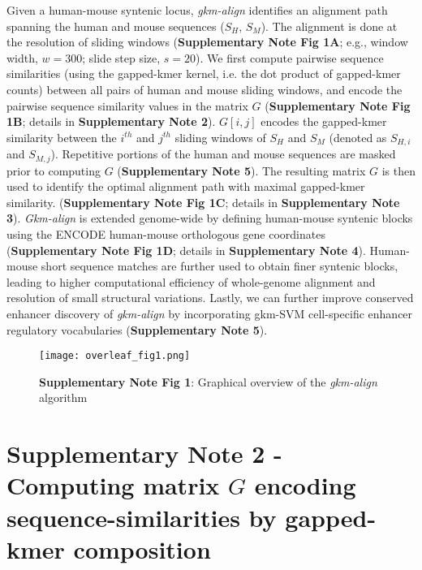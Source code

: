 \documentclass[english]{article}
\begin{document}
Given a human-mouse syntenic locus, \textit{gkm-align} identifies an alignment path spanning the human and mouse sequences ($S_H$, $S_M$). The alignment is done at the resolution of sliding windows (\textbf{Supplementary Note Fig 1A}; e.g., window width, $w = 300$; slide step size, $s = 20$). We first compute pairwise sequence similarities (using the gapped-kmer kernel, i.e. the dot product of gapped-kmer counts) between all pairs of human and mouse sliding windows, and encode the pairwise sequence similarity values in the matrix $G$ (\textbf{Supplementary Note Fig 1B}; details in \textbf{Supplementary Note 2}). $G[i,j]$ encodes the gapped-kmer similarity between the $i^{th}$ and $j^{th}$ sliding windows of $S_H$ and ${S_M}$ (denoted as $S_{H,i}$ and $S_{M,j}$). Repetitive portions of the human and mouse sequences are masked prior to computing $G$ (\textbf{Supplementary Note 5}). The resulting matrix $G$ is then used to identify the optimal alignment path with maximal gapped-kmer similarity. (\textbf{Supplementary Note Fig 1C}; details in \textbf{Supplementary Note 3}). \textit{Gkm-align} is extended genome-wide by defining human-mouse syntenic blocks using the ENCODE human-mouse orthologous gene coordinates (\textbf{Supplementary Note Fig 1D}; details in \textbf{Supplementary Note 4}). Human-mouse short sequence matches are further used to obtain finer syntenic blocks, leading to higher computational efficiency of whole-genome alignment and resolution of small structural variations. Lastly, we can further improve conserved enhancer discovery of \textit{gkm-align} by incorporating gkm-SVM cell-specific enhancer regulatory vocabularies (\textbf{Supplementary Note 5}).

\begin{figure}[H]
\hspace*{0cm} 
\texttt{[image: overleaf\_fig1.png]}
\caption{\textbf{Supplementary Note Fig 1}: Graphical overview of the \textit{gkm-align} algorithm}
\end{figure}
    


\section{Supplementary Note 2 - Computing matrix $G$ encoding sequence-similarities by gapped-kmer composition} 
\end{document}
